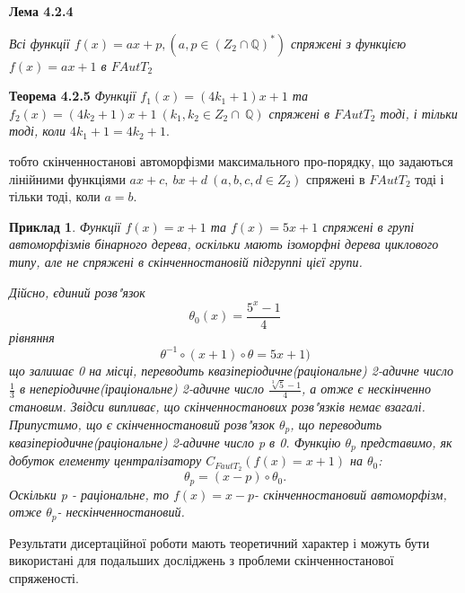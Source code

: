 \documentclass[a4paper,12pt]{article} \usepackage{a4wide}
\numberwithin{equation}{subsection}
\newtheorem{example}{Приклад}[subsection]
\begin{document}
 \textbf{Лема 4.2.4}

  \emph{ Всі функції $f(x)=ax+p,(a,p\in
(Z_2\cap{\mathbb{Q}})^*  )$ спряжені з функцією $f(x)=ax+1$  в
$FAutT_2$}




 \textbf{Теорема 4.2.5}
 \emph{Функції $f_1(x)=(4k_1+1)x+1$ та $f_2(x)=(4k_2+1)x+1 \ (k_1,k_2 \in
Z_2\cap\ {\mathbb{Q}})$ спряжені в $FAutT_2$ тоді, і тільки тоді,
коли $ 4k_1+1=4k_2+1.$ }

тобто скінченностанові автоморфізми максимального про-порядку, що
задаються лінійними
 функціями $ax+c,\ bx+d\ (a,b,c,d\in Z_2)$ спряжені в $FAutT_2$ тоді і тільки тоді, коли
  $a=b$.

\begin{example}
Функції $f(x)=x+1$ та $f(x)=5x+1$ спряжені в групі автоморфізмів
бінарного дерева, оскільки мають ізоморфні дерева циклового типу,
але не спряжені в скінченностановій підгруппі цієї групи.

 Дійсно, єдиний розв"язок $$\theta_0(x)=\frac{5^x-1}{4}$$ рівняння $$\theta^{-1}\circ(x+1)\circ \theta=5x+1)$$
 що залишає 0 на місці, переводить квазіперіодичне(раціональне) 2-адичне
 число $\frac{1}{3}$
 в неперіодичне(іраціональне) 2-адичне число $\frac{\sqrt[3]{5}-1}{4}$, а отже є нескінченно
 становим. Звідси випливає, що скінченностанових розв"язків немає
 взагалі. Припустимо, що є скінченностановий розв"язок $\theta_p$, що переводить квазіперіодичне(раціональне) 2-адичне
 число p в
 0. Функцію $\theta_p$ представимо, як добуток елементу
 централізатору $C_{FautT_2}(f(x)=x+1)$ на $\theta_0$:$$\theta_p=(x-p)\circ \theta_0
 .$$ Оскільки p - раціональне, то $f(x)=x-p$- скінченностановий автоморфізм,
 отже $\theta_p$- нескінченностановий.

\end{example}












Результати дисертаційної роботи мають теоретичний характер і можуть бути використані для подальших досліджень з
проблеми скінченностанової спряженості.
\end{document}
